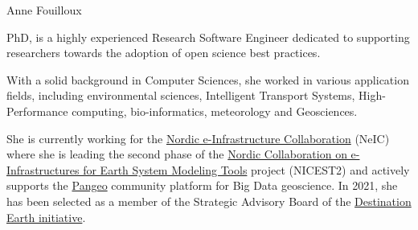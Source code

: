 \begin{participant}[gender=female]{Anne Fouilloux}






  \medskip PhD, is a highly experienced Research Software Engineer dedicated to supporting
  researchers towards the adoption of open science best practices.

  With a solid background in Computer Sciences, she worked in various application fields, including environmental sciences, Intelligent Transport Systems, High-Performance computing, bio-informatics, meteorology and Geosciences.

  She is currently working for the \href{https://neic.no}{Nordic e-Infrastructure Collaboration} (NeIC) where she is leading the second phase of the \href{https://neic.no/nicest2/}{Nordic Collaboration on e-Infrastructures for Earth System Modeling Tools} project (NICEST2) and actively supports the \href{https://pangeo.io/}{Pangeo} community platform for Big Data geoscience. In 2021, she has been selected as a member of the Strategic Advisory Board of the \href{https://stories.ecmwf.int/destination-earth/index.html}{Destination Earth initiative}. 


\end{participant}
